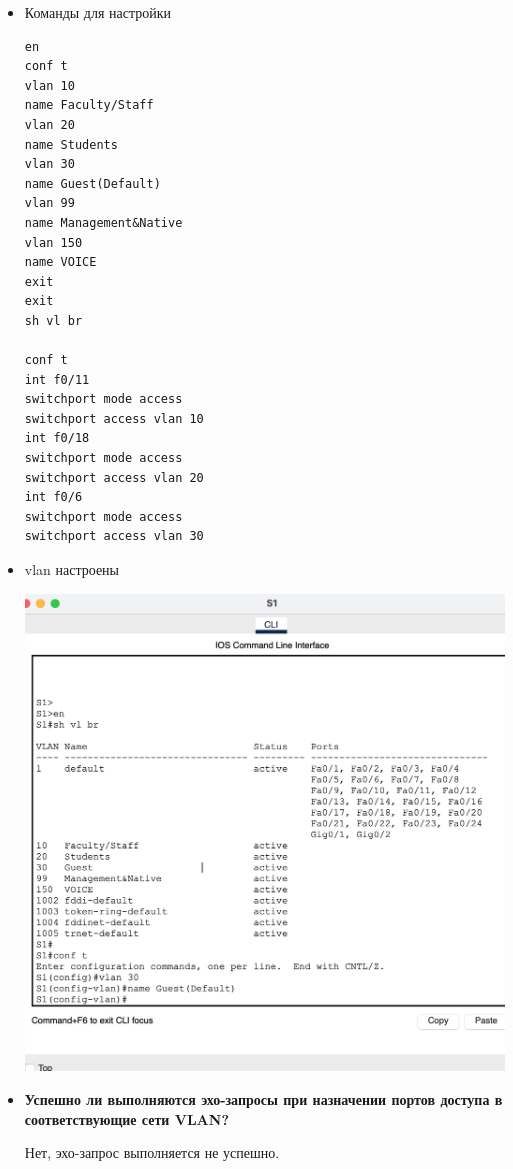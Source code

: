 \documentclass[a4paper,14pt]{extarticle}
\begin{document}
\begin{enumerate}
\begin{itemize}
            \item Команды для настройки
                \begin{lstlisting}
en
conf t
vlan 10 
name Faculty/Staff
vlan 20 
name Students
vlan 30 
name Guest(Default)
vlan 99 
name Management&Native
vlan 150 
name VOICE
exit
exit
sh vl br
                    
conf t
int f0/11
switchport mode access
switchport access vlan 10
int f0/18
switchport mode access
switchport access vlan 20
int f0/6
switchport mode access
switchport access vlan 30
                \end{lstlisting}
            \item vlan настроены
                \begin{center}
                    \includegraphics[scale=0.4]{pics/3.3.12_3.png}
                \end{center}
            \item \textbf{Успешно ли выполняются эхо-запросы при назначении портов доступа в соответствующие сети VLAN?}\par
                Нет, эхо-запрос выполняется не успешно. 
                \begin{center}

\end{center}
\end{itemize}
\end{enumerate}
\end{document}
